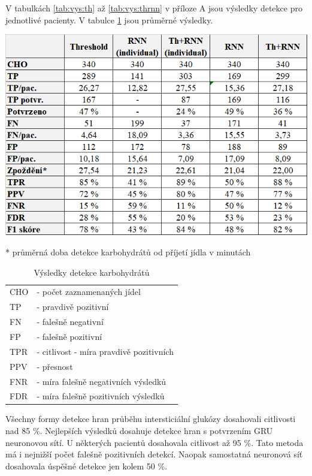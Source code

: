 V tabulkách \ref{tab:vys:th} až \ref{tab:vys:thrnn} v příloze A jsou výsledky detekce pro jednotlivé pacienty. V tabulce \ref{tab:res_cho} jsou průměrné výsledky.

\begin{table}[H]
\caption{Výsledky detekce karbohydrátů}
\label{tab:res_cho}
\includegraphics[width=1\textwidth]{img/vysledky/cho/cho.png}
\begin{flushleft}
* průměrná doba detekce karbohydrátů od příjetí jídla v minutách\\
\begin{tabular}{ll}
CHO & - počet zaznamenaných jídel\\
TP & - pravdivě pozitivní\\
FN & - falešně negativní\\
FP & - falešně pozitivní\\
TPR & - citlivost - míra pravdivě pozitivních\\
PPV & - přesnost\\
FNR & - míra falešně negativních výsledků \\
FDR & - míra falešně pozitivních výsledků\\
\end{tabular}
\end{flushleft}
\end{table}
\vspace*{-7mm}

Všechny formy detekce hran průběhu intersticiální glukózy dosahovali citlivosti nad 85 \%. Nejlepších výsledků dosahuje detekce hran s potvrzením GRU neuronovou sítí. U některých pacientů dosahovala citlivost až 95 \%. Tato metoda má i nejnižší počet falešně pozitivních detekcí. Naopak samostatná neuronová síť dosahovala úspěšné detekce jen kolem 50 \%.

